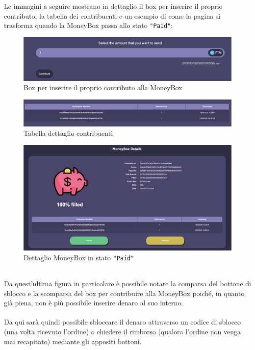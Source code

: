             Le immagini a seguire mostrano in dettaglio il box per inserire il proprio contributo, la tabella dei contribuenti e un esempio di come la pagina si trasforma quando la MoneyBox passa allo stato \texttt{"Paid"}:
            \begin{figure}[H]
                \centering
                \includegraphics[scale=0.3]{immagini/Checkout/Contribute.png} 
                \caption{Box per inserire il proprio contributo alla MoneyBox}
            \end{figure}
            \begin{figure}[H]
                \centering
                \includegraphics[scale=0.25]{immagini/Checkout/ContributionsTable.png} 
                \caption{Tabella dettaglio contribuenti}
            \end{figure}
            \begin{figure}[H]
                \centering
                \includegraphics[scale=0.2]{immagini/Checkout/FilledMoneyBox.png} 
                \caption{Dettaglio MoneyBox in stato \texttt{"Paid"}}
            \end{figure}
            \textbf{}\\
            Da quest'ultima figura in particolare è possibile notare la comparsa del bottone di sblocco e la scomparsa del box per contribuire alla MoneyBox poiché, in quanto già piena, non è più possibile inserire denaro al suo interno.\\\\
            Da qui sarà quindi possibile sbloccare il denaro attraverso un codice di sblocco (una volta ricevuto l'ordine) o chiedere il rimborso (qualora l'ordine non venga mai recapitato) mediante gli appositi bottoni.

